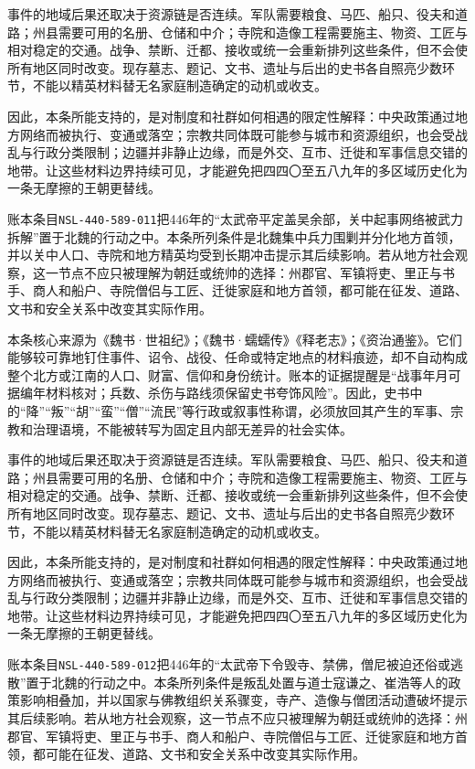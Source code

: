 事件的地域后果还取决于资源链是否连续。军队需要粮食、马匹、船只、役夫和道路；州县需要可用的名册、仓储和中介；寺院和造像工程需要施主、物资、工匠与相对稳定的交通。战争、禁断、迁都、接收或统一会重新排列这些条件，但不会使所有地区同时改变。现存墓志、题记、文书、遗址与后出的史书各自照亮少数环节，不能以精英材料替无名家庭制造确定的动机或收支。

因此，本条所能支持的，是对制度和社群如何相遇的限定性解释：中央政策通过地方网络而被执行、变通或落空；宗教共同体既可能参与城市和资源组织，也会受战乱与行政分类限制；边疆并非静止边缘，而是外交、互市、迁徙和军事信息交错的地带。让这些材料边界持续可见，才能避免把四四〇至五八九年的多区域历史化为一条无摩擦的王朝更替线。

账本条目\texttt{NSL-440-589-011}把446年的“太武帝平定盖吴余部，关中起事网络被武力拆解”置于北魏的行动之中。本条所列条件是北魏集中兵力围剿并分化地方首领，并以关中人口、寺院和地方精英均受到长期冲击提示其后续影响。若从地方社会观察，这一节点不应只被理解为朝廷或统帅的选择：州郡官、军镇将吏、里正与书手、商人和船户、寺院僧侣与工匠、迁徙家庭和地方首领，都可能在征发、道路、文书和安全关系中改变其实际作用。

本条核心来源为《魏书·世祖纪》；《魏书·蠕蠕传》《释老志》；《资治通鉴》。它们能够较可靠地钉住事件、诏令、战役、任命或特定地点的材料痕迹，却不自动构成整个北方或江南的人口、财富、信仰和身份统计。账本的证据提醒是“战事年月可据编年材料核对；兵数、杀伤与路线须保留史书夸饰风险”。因此，史书中的“降”“叛”“胡”“蛮”“僧”“流民”等行政或叙事性称谓，必须放回其产生的军事、宗教和治理语境，不能被转写为固定且内部无差异的社会实体。

事件的地域后果还取决于资源链是否连续。军队需要粮食、马匹、船只、役夫和道路；州县需要可用的名册、仓储和中介；寺院和造像工程需要施主、物资、工匠与相对稳定的交通。战争、禁断、迁都、接收或统一会重新排列这些条件，但不会使所有地区同时改变。现存墓志、题记、文书、遗址与后出的史书各自照亮少数环节，不能以精英材料替无名家庭制造确定的动机或收支。

因此，本条所能支持的，是对制度和社群如何相遇的限定性解释：中央政策通过地方网络而被执行、变通或落空；宗教共同体既可能参与城市和资源组织，也会受战乱与行政分类限制；边疆并非静止边缘，而是外交、互市、迁徙和军事信息交错的地带。让这些材料边界持续可见，才能避免把四四〇至五八九年的多区域历史化为一条无摩擦的王朝更替线。

账本条目\texttt{NSL-440-589-012}把446年的“太武帝下令毁寺、禁佛，僧尼被迫还俗或逃散”置于北魏的行动之中。本条所列条件是叛乱处置与道士寇谦之、崔浩等人的政策影响相叠加，并以国家与佛教组织关系骤变，寺产、造像与僧团活动遭破坏提示其后续影响。若从地方社会观察，这一节点不应只被理解为朝廷或统帅的选择：州郡官、军镇将吏、里正与书手、商人和船户、寺院僧侣与工匠、迁徙家庭和地方首领，都可能在征发、道路、文书和安全关系中改变其实际作用。

